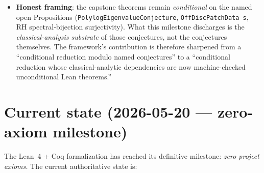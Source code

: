 \begin{itemize}
  at $s = 1$ exhibits an irremovable principal-branch obstruction
  under mathlib's current regularization of $\mathrm{Li}_1$ at the
  logarithmic-singularity boundary. This is a finding \emph{of the
  chain}, not of the manuscript's branch-selection mechanism: the
  regularization is the source of the obstruction, and a refactor
  against a different regularization choice would dissolve it.
\item \textbf{Honest framing}: the capstone theorems remain
  \emph{conditional} on the named open Propositions
  (\texttt{PolylogEigenvalueConjecture}, \texttt{OffDiscPatchData s},
  RH spectral-bijection surjectivity). What this milestone discharges
  is the \emph{classical-analysis substrate} of those conjectures, not
  the conjectures themselves. The framework's contribution is
  therefore sharpened from a ``conditional reduction modulo named
  conjectures'' to a ``conditional reduction whose classical-analytic
  dependencies are now machine-checked unconditional Lean theorems.''
\end{itemize}

\section*{Current state (2026-05-20 --- zero-axiom milestone)}

The Lean~4 + Coq formalization has reached its definitive milestone:
\emph{zero project axioms.} The current authoritative state is:


